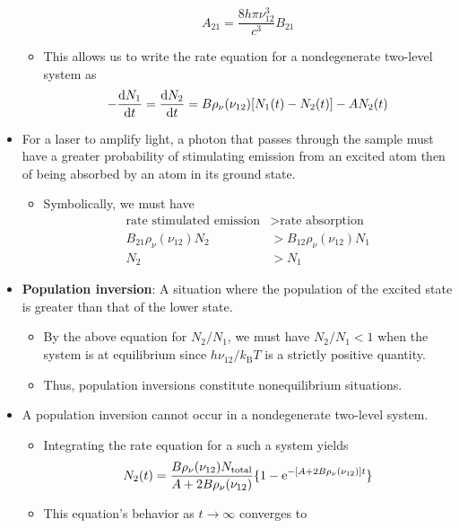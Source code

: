 \documentclass[../notes.tex]{subfiles}
\begin{document}
\begin{itemize}
\begin{itemize}
\begin{equation*}
            A_{21} = \frac{8h\pi\nu_{12}^3}{c^3}B_{21}
        \end{equation*}
        \item This allows us to write the rate equation for a nondegenerate two-level system as
        \begin{equation*}
            -\dv{N_1}{t} = \dv{N_2}{t} = B\rho_\nu(\nu_{12})[N_1(t)-N_2(t)]-AN_2(t)
        \end{equation*}
    \end{itemize}
    \item For a laser to amplify light, a photon that passes through the sample must have a greater probability of stimulating emission from an excited atom then of being absorbed by an atom in its ground state.
    \begin{itemize}
        \item Symbolically, we must have
        \begin{align*}
            \text{rate stimulated emission} &> \text{rate absorption}\\
            B_{21}\rho_\nu(\nu_{12})N_2 &> B_{12}\rho_\nu(\nu_{12})N_1\\
            N_2 &> N_1
        \end{align*}
    \end{itemize}
    \item \textbf{Population inversion}: A situation where the population of the excited state is greater than that of the lower state.
    \begin{itemize}
        \item By the above equation for $N_2/N_1$, we must have $N_2/N_1<1$ when the system is at equilibrium since $h\nu_{12}/k_\text{B}T$ is a strictly positive quantity.
        \item Thus, population inversions constitute nonequilibrium situations.
    \end{itemize}
    \item A population inversion cannot occur in a nondegenerate two-level system.
    \begin{itemize}
        \item Integrating the rate equation for a such a system yields
        \begin{equation*}
            N_2(t) = \frac{B\rho_\nu(\nu_{12})N_\text{total}}{A+2B\rho_\nu(\nu_{12})}\{1-\e[-[{A+2B\rho_\nu(\nu_{12})]t}]\}
        \end{equation*}
        \item This equation's behavior as $t\to\infty$ converges to

\end{itemize}
\end{itemize}
\end{document}
